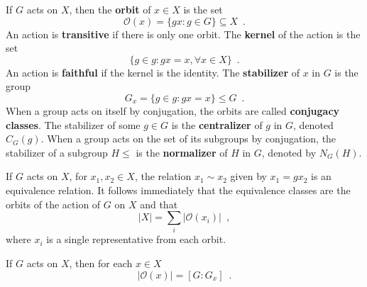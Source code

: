 \begin{definition}
	\cite[100]{Rotman1967}
	\cite[112]{DummitFoote2004}
	If $G$ acts on $X$, then the \textbf{orbit} of $x \in X$ is the set
	\begin{equation}
		\mathcal{O}(x) = \{ gx : g \in G \} \subseteq X \enspace.
	\end{equation}
	An action is \textbf{transitive} if there is only one orbit. The \textbf{kernel}
	of the action is the set
	\begin{equation}
		\{ g \in g : gx = x, \forall x \in X \} \enspace.
	\end{equation}
	An action is \textbf{faithful} if the kernel is the identity. The
	\textbf{stabilizer} of $x$ in $G$ is the group
	\begin{equation}
		G_x = \{ g \in g : gx = x \} \leq G \enspace.
	\end{equation}
	When a group acts on itself by conjugation, the orbits are called
	\textbf{conjugacy classes}. The stabilizer of some $g \in G$ is the
	\textbf{centralizer} of $g$ in $G$, denoted $C_G(g)$. When a group acts on the set of
	its subgroups by conjugation, the stabilizer of a subgroup $H \leq$ is the
	\textbf{normalizer} of $H$ in $G$, denoted by $N_G(H)$.
\end{definition}

\begin{proposition}
	\cite[102]{Rotman1967}
	\cite[114]{DummitFoote2004}
	\cite[250]{Tucker1974}
	If $G$ acts on $X$, for $x_1, x_2 \in X$, the relation $x_1 \sim x_2$ given by
	$x_1 = gx_2$ is an equivalence relation. It follows immediately that the equivalence
	classes are the orbits of the action of $G$ on $X$ and that
	\begin{equation}
		|X| = \sum_i |\mathcal{O}(x_i)| \enspace,
	\end{equation}
	where $x_i$ is a single representative from each orbit.
\end{proposition}

\begin{theorem}
	\cite[102]{Rotman1967}
	If $G$ acts on $X$, then for each $x \in X$
	\begin{equation}
		|\mathcal{O}(x)| = [G : G_x] \enspace.
	\end{equation}
\end{theorem}


